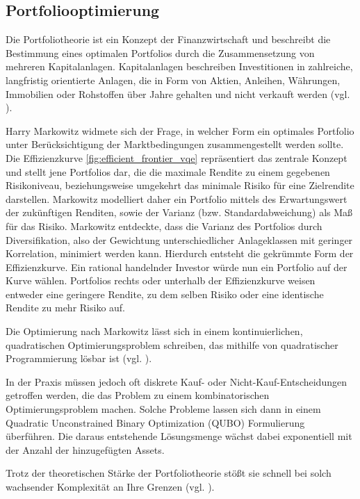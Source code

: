 \subsection{Portfoliooptimierung}
Die Portfoliotheorie ist ein Konzept der Finanzwirtschaft und beschreibt die Bestimmung eines optimalen Portfolios durch die Zusammensetzung von mehreren Kapitalanlagen. Kapitalanlagen beschreiben Investitionen in zahlreiche, langfristig orientierte Anlagen, die in Form von Aktien, Anleihen, Währungen, Immobilien oder Rohstoffen über Jahre gehalten und nicht verkauft werden (vgl. \cite{orus_quantum_2019, sakuler_real-world_2025}).

Harry Markowitz widmete sich der Frage, in welcher Form ein optimales Portfolio unter Berücksichtigung der Marktbedingungen zusammengestellt werden sollte. Die Effizienzkurve \ref{fig:efficient_frontier_vqe} repräsentiert das zentrale Konzept und stellt jene Portfolios dar, die die maximale Rendite zu einem gegebenen Risikoniveau, beziehungsweise umgekehrt das minimale Risiko für eine Zielrendite darstellen. Markowitz modelliert daher ein Portfolio mittels des Erwartungswert der zukünftigen Renditen, sowie der Varianz (bzw. Standardabweichung) als Maß für das Risiko. Markowitz entdeckte, dass die Varianz des Portfolios durch Diversifikation, also der Gewichtung unterschiedlicher Anlageklassen mit geringer Korrelation, minimiert werden kann. Hierdurch entsteht die gekrümmte Form der Effizienzkurve. Ein rational handelnder Investor würde nun ein Portfolio auf der Kurve wählen. Portfolios rechts oder unterhalb der Effizienzkurve weisen entweder eine geringere Rendite, zu dem selben Risiko oder eine identische Rendite zu mehr Risiko auf.

Die Optimierung nach Markowitz lässt sich in einem kontinuierlichen, quadratischen Optimierungsproblem schreiben, das mithilfe von quadratischer Programmierung lösbar ist
(vgl. \cite{markowitz_portfolio_1952}).

In der Praxis müssen jedoch oft diskrete Kauf- oder Nicht-Kauf-Entscheidungen getroffen werden, die das Problem zu einem kombinatorischen Optimierungsproblem machen. Solche Probleme lassen sich dann in einem Quadratic Unconstrained Binary Optimization (QUBO) Formulierung überführen. Die daraus entstehende Lösungsmenge wächst dabei exponentiell mit der Anzahl der hinzugefügten Assets.

Trotz der theoretischen Stärke der Portfoliotheorie stößt sie schnell bei solch wachsender Komplexität an Ihre Grenzen (vgl. \cite{sakuler_real-world_2025, orus_quantum_2019}).

